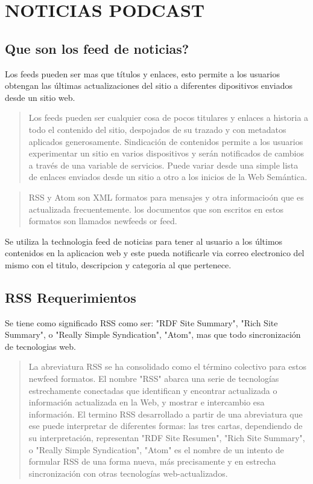 \chapter{NOTICIAS PODCAST}

\section{Que son los feed de noticias?}

Los feeds pueden ser mas que t\'{i}tulos y enlaces, esto permite a los usuarios obtengan las \'{u}ltimas actualizaciones
del sitio a diferentes dipositivos enviados desde un sitio web.

\scriptsize

\blockquote{
Los feeds pueden ser cualquier cosa de pocos titulares y enlaces a historia a todo el contenido del sitio, despojados
de su trazado y con metadatos aplicados generosamente. Sindicaci\'{o}n de contenidos permite a los usuarios experimentar
un sitio en varios dispositivos y ser\'{a}n notificados de cambios a trav\'{e}s de una variable de servicios. Puede variar
desde una simple lista de enlaces enviados desde un sitio a otro a los inicios de la Web Sem\'{a}ntica.\cite{hammersley2005developing}
}

\blockquote{
RSS y Atom son XML formatos para mensajes y otra informacio\'{o}n que es actualizada frecuentemente.
los documentos que son escritos en estos formatos son llamados newfeeds or feed.\cite{wittenbrink2005rss}
}

\normalsize

Se utiliza la technologia feed de noticias para tener al usuario a los \'{u}ltimos contenidos en la aplicacion web
y este pueda notificarle via correo electronico del mismo con el titulo, descripcion y categoria al que pertenece.


\section{RSS Requerimientos}

Se tiene como significado RSS como ser: "RDF Site Summary", "Rich Site Summary", o "Really Simple Syndication",
"Atom", mas que todo sincronizaci\'{o}n de tecnologias web.

\scriptsize

\begin{flushleft}

\blockquote{
La abreviatura RSS se ha consolidado como el t\'{e}rmino colectivo para estos newfeed formatos. El nombre "RSS"
abarca una serie de tecnolog\'{i}as estrechamente conectadas que identifican y encontrar actualizada o informaci\'{o}n
actualizada en la Web, y mostrar e intercambio esa informaci\'{o}n. El termino RSS desarrollado a partir de una abreviatura que ese puede interpretar de diferentes formas: las tres cartas, dependiendo de su interpretaci\'{o}n,
representan "RDF Site Resumen", "Rich Site Summary", o "Really Simple Syndication", "Atom" es el nombre de un intento
de formular RSS de una forma nueva, m\'{a}s precisamente y en estrecha sincronizaci\'{o}n con otras tecnolog\'{i}as web-actualizados.\cite{wittenbrink2005rss}
}

\end{flushleft}

